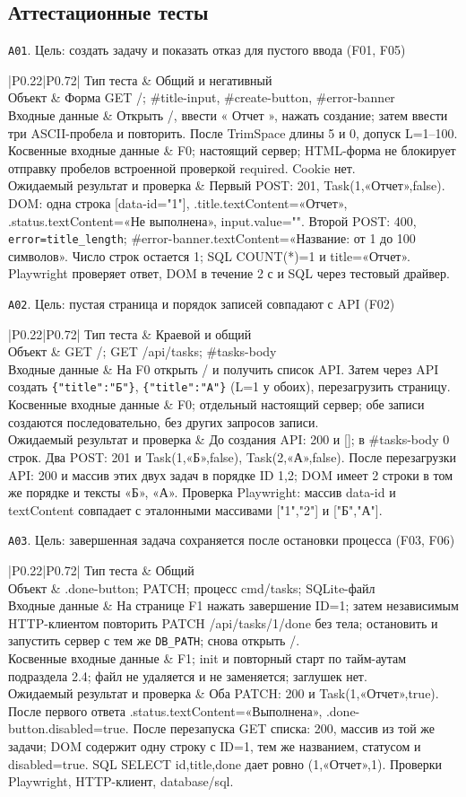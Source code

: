 \documentclass[12pt,a4paper]{extarticle}
\newcommand{\code}[1]{\nolinkurl{#1}}
\newcommand{\rucode}[1]{\texttt{#1}}
\newcommand{\testcase}[6]{%
  \par\addvspace{12pt}\noindent #1\par\nopagebreak
  \begin{longtable}{|P{0.22\textwidth}|P{0.72\textwidth}|}
  \hline
  Тип теста & #2 \\ \hline
  Объект & #3 \\ \hline
  Входные данные & #4 \\ \hline
  Косвенные входные данные & #5 \\ \hline
  Ожидаемый результат и проверка & #6 \\ \hline
  \end{longtable}}
\begin{document}
\subsection{Аттестационные тесты}
\testcase{\texttt{A01}. Цель: создать задачу и показать отказ для пустого ввода (F01, F05)}
{Общий и негативный}
{Форма GET /; \#title-input, \#create-button, \#error-banner}
{Открыть /, ввести «  Отчет  », нажать создание; затем ввести
три ASCII-пробела и повторить. После TrimSpace длины 5 и 0,
допуск L=1--100.}
{F0; настоящий сервер; HTML-форма не блокирует отправку пробелов
встроенной проверкой required. Cookie нет.}
{Первый POST: 201, Task(1,«Отчет»,false).
DOM: одна строка [data-id="1"], .title.textContent=«Отчет»,
.status.textContent=«Не выполнена», input.value="".
Второй POST: 400, \code{error=title_length};
\#error-banner.textContent=«Название: от 1 до 100 символов».
Число строк остается 1; SQL COUNT(*)=1 и title=«Отчет».
Playwright проверяет ответ, DOM в течение 2 с и SQL через тестовый драйвер.}

\testcase{\texttt{A02}. Цель: пустая страница и порядок записей совпадают с API (F02)}
{Краевой и общий}
{GET /; GET /api/tasks; \#tasks-body}
{На F0 открыть / и получить список API.
Затем через API создать \rucode{\{"title":"Б"\}},
\rucode{\{"title":"А"\}} (L=1 у обоих), перезагрузить страницу.}
{F0; отдельный настоящий сервер; обе записи создаются
последовательно, без других запросов записи.}
{До создания API: 200 и []; в \#tasks-body 0 строк.
Два POST: 201 и Task(1,«Б»,false), Task(2,«А»,false).
После перезагрузки API: 200 и массив этих двух задач в порядке ID 1,2;
DOM имеет 2 строки в том же порядке и тексты «Б», «А».
Проверка Playwright: массив data-id и textContent совпадает
с эталонными массивами ["1","2"] и ["Б","А"].}

\testcase{\texttt{A03}. Цель: завершенная задача сохраняется после остановки процесса (F03, F06)}
{Общий}
{.done-button; PATCH; процесс cmd/tasks; SQLite-файл}
{На странице F1 нажать завершение ID=1; затем независимым HTTP-клиентом
повторить PATCH /api/tasks/1/done без тела; остановить и запустить
сервер с тем же \code{DB_PATH}; снова открыть /.}
{F1; init и повторный старт по тайм-аутам подраздела 2.4;
файл не удаляется и не заменяется; заглушек нет.}
{Оба PATCH: 200 и Task(1,«Отчет»,true).
После первого ответа .status.textContent=«Выполнена»,
.done-button.disabled=true. После перезапуска GET списка: 200,
массив из той же задачи; DOM содержит одну строку с ID=1,
тем же названием, статусом и disabled=true.
SQL SELECT id,title,done дает ровно (1,«Отчет»,1).
Проверки Playwright, HTTP-клиент, database/sql.}
\end{document}

